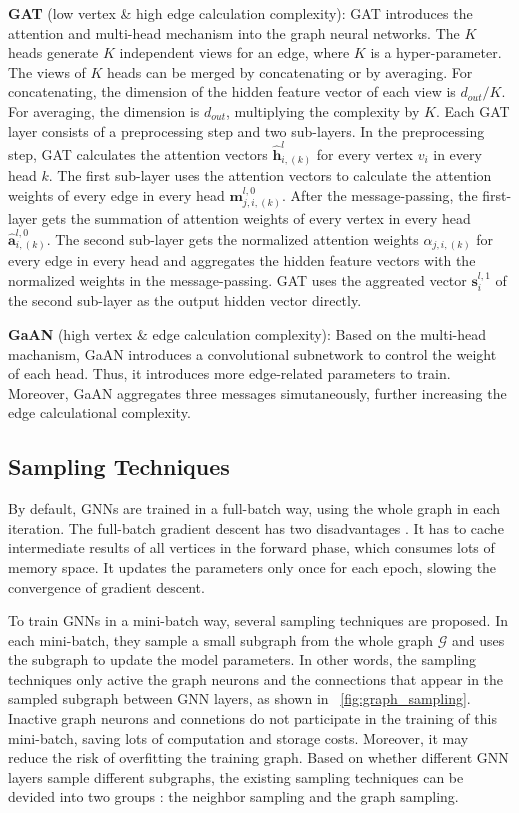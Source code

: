 \textbf{GAT} (low vertex \& high edge calculation complexity):
GAT introduces the attention and multi-head mechanism into the graph neural networks.
The $K$ heads generate $K$ independent views for an edge, where $K$ is a hyper-parameter.
The views of $K$ heads can be merged by concatenating or by averaging.
For concatenating, the dimension of the hidden feature vector of each view is $d_{out}/K$.
For averaging, the dimension is $d_{out}$, multiplying the complexity by $K$.
Each GAT layer consists of a preprocessing step and two sub-layers.
In the preprocessing step, GAT calculates the attention vectors $\hat{\boldsymbol{h}}^{l}_{i,(k)}$ for every vertex $v_i$ in every head $k$.
The first sub-layer uses the attention vectors to calculate the attention weights of every edge in every head $\boldsymbol{m}^{l,0}_{j,i,(k)}$.
After the message-passing, the first-layer gets the summation of attention weights of every vertex in every head $\hat{\boldsymbol{a}}^{l,0}_{i,(k)}$.
The second sub-layer gets the normalized attention weights $\alpha_{j, i, (k)}$ for every edge in every head and aggregates the hidden feature vectors with the normalized weights in the message-passing.
GAT uses the aggreated vector $\boldsymbol{s}^{l,1}_i$ of the second sub-layer as the output hidden vector directly.

\textbf{GaAN} (high vertex \& edge calculation complexity):
Based on the multi-head machanism, GaAN introduces a convolutional subnetwork to control the weight of each head.
Thus, it introduces more edge-related parameters to train.
Moreover, GaAN aggregates three messages simutaneously, further increasing the edge calculational complexity.

\subsection{Sampling Techniques}

By default, GNNs are trained in a full-batch way, using the whole graph in each iteration.
The full-batch gradient descent has two disadvantages \cite{chiang2019_cluster_gcn}.
It has to cache intermediate results of all vertices in the forward phase, which consumes lots of memory space.
It updates the parameters only once for each epoch, slowing the convergence of gradient descent.

To train GNNs in a mini-batch way, several sampling techniques \cite{chiang2019_cluster_gcn} are proposed.
In each mini-batch, they sample a small subgraph from the whole graph $\mathcal{G}$ and uses the subgraph to update the model parameters.
In other words, the sampling techniques only active the graph neurons and the connections that appear in the sampled subgraph between GNN layers, as shown in \figurename~\ref{fig:graph_sampling}.
Inactive graph neurons and connetions do not participate in the training of this mini-batch, saving lots of computation and storage costs.
Moreover, it may reduce the risk of overfitting the training graph.
Based on whether different GNN layers sample different subgraphs, the existing sampling techniques can be devided into two groups \cite{zeng2020_graphsaint}: the neighbor sampling and the graph sampling.


